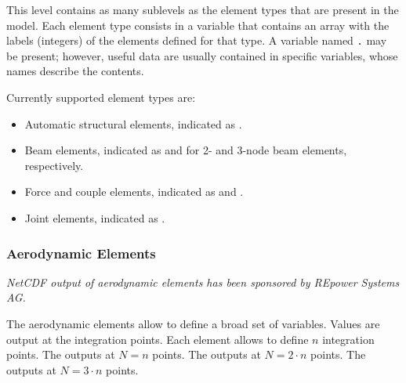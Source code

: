 This level contains as many sublevels as the element types
that are present in the model.
Each element type consists in a variable that contains an array
with the labels (integers) of the elements defined for that type.
A variable named \texttt{.} may be present; however,
useful data are usually contained in specific variables,
whose names describe the contents.

Currently supported element types are:
\begin{itemize}
\item Automatic structural elements, indicated as .
\item Beam elements, indicated as  and 
for 2- and 3-node beam elements, respectively.
\item Force and couple elements, indicated as  and .
\item Joint elements, indicated as .
\end{itemize}


\subsubsection{Aerodynamic Elements}
\label{sec:NetCDF:Elem:Aerodynamic}
\emph{NetCDF output of aerodynamic elements has been sponsored
by REpower Systems AG.}

The aerodynamic elements allow to define a broad set of variables.
Values are output at the integration points.
Each element allows to define $n$ integration points.
The  outputs at $N = n$ points.
The  outputs at $N = 2 \cdot n$ points.
The  outputs at $N = 3 \cdot n$ points.

